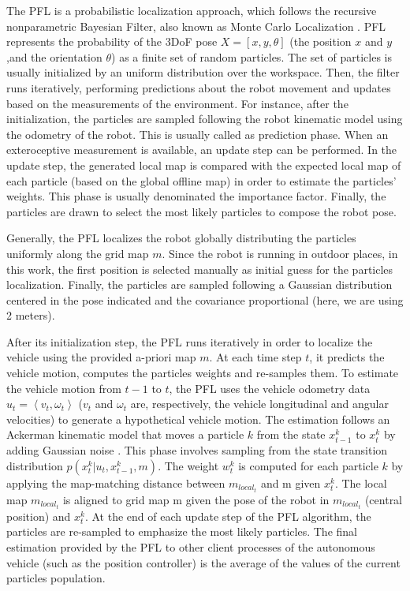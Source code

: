 The PFL is a probabilistic localization approach, which follows the recursive nonparametric Bayesian Filter, also known as Monte Carlo Localization \cite{26thrun2005probabilistic}. PFL represents the probability of the 3DoF pose $X=[x,y,\theta]$ (the position $x$ and $y$,and the orientation $\theta$) as a finite set of random particles. The set of particles is usually initialized by an uniform distribution over the workspace. Then, the filter runs iteratively, performing predictions about the robot movement and updates based on the measurements of the environment. For instance, after the initialization, the particles are sampled following the robot kinematic model using the odometry of the robot. This is usually called as prediction phase. When an exteroceptive measurement is available, an update step can be performed. In the update step, the generated local map is compared with the expected local map of each particle (based on the global offline map) in order to estimate the particles' weights. This phase is usually denominated the importance factor. Finally, the particles are drawn to select the most likely particles to compose the robot pose.

Generally, the PFL localizes the robot globally distributing the particles uniformly along the grid map $m$. Since the robot is running in outdoor places, in this work, the first position is selected manually as initial guess for the particles localization. Finally, the particles are sampled following a Gaussian distribution centered in the pose indicated and the covariance proportional (here, we are using 2 meters).
 
After its initialization step, the PFL runs iteratively in order to localize the vehicle using the provided a-priori map $m$. At each time step $t$, it predicts the vehicle motion, computes the particles weights and re-samples them. To estimate the vehicle motion from $t-1$ to $t$, the PFL uses the vehicle odometry data $u_t=\left\langle v_t,\omega_t\right\rangle $ ($v_t$ and $\omega_t$ are, respectively, the vehicle longitudinal and angular velocities) to generate a hypothetical vehicle motion. The estimation follows an Ackerman kinematic model that  moves a particle $k$ from the state $x_{t-1}^k$  to $x_t^k$ by adding Gaussian noise \cite{54sotelo2003lateral}. This phase involves sampling from the state transition distribution $p(x_t^k |u_t,x_{t-1}^k,m)$. The weight $w_t^k$ is computed for each particle $k$ by applying the map-matching distance between $m_{local_{t}}$ and m given $x_t^k$. The local map $m_{local_{t}}$  is aligned to grid map m given the pose of the robot in $m_{local_{t}}$ (central position) and $x_t^k$. At the end of each update step of the PFL algorithm, the particles are re-sampled to emphasize the most likely particles. The final estimation provided by the PFL to other client processes of the autonomous vehicle (such as the position controller) is the average of the values of the current particles population. 

